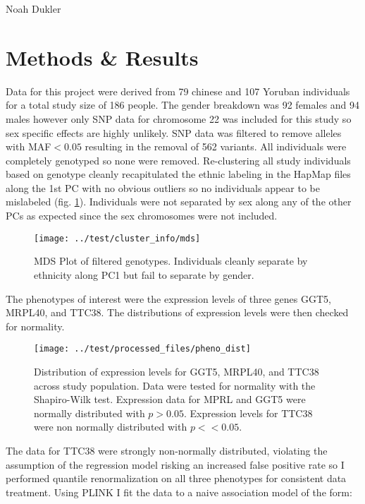 \documentclass[12pt,a4paper]{article}
\begin{document}
\noindent Noah Dukler

\section{Methods \& Results}
Data for this project were derived from 79 chinese and 107 Yoruban individuals for a total study size of 186 people. The gender breakdown was 92 females and 94 males however only SNP data for chromosome 22 was included for this study so sex specific effects are highly unlikely. SNP data was filtered to remove alleles with MAF$<0.05$ resulting in the removal of 562 variants. All individuals were completely genotyped so none were removed. Re-clustering all study individuals based on genotype cleanly recapitulated the ethnic labeling in the HapMap files along the 1st PC with no obvious outliers so no individuals appear to be mislabeled (fig. \ref{fig:mds}). Individuals were not separated by sex along any of the other PCs as expected since the sex chromosomes were not included.   

\begin{figure}[h]
\centering
\texttt{[image: ../test/cluster\_info/mds]}
\caption[MDS Plot]{MDS Plot of filtered genotypes. Individuals cleanly separate by ethnicity along PC1 but fail to separate by gender.}
\label{fig:mds}
\end{figure}

The phenotypes of interest were the expression levels of three genes GGT5, MRPL40, and TTC38. The distributions of expression levels were then checked for normality. 

\begin{figure}[h]
\centering
\texttt{[image: ../test/processed\_files/pheno\_dist]}
\caption[Pheno_dist]{Distribution of expression levels for GGT5, MRPL40, and TTC38 across study population. Data were tested for normality with the Shapiro-Wilk test. Expression data for MPRL and GGT5 were normally distributed with $p>0.05$. Expression levels for TTC38 were non normally distributed with $p<<0.05$.}
\label{fig:pheno_dist}
\end{figure}

The data for TTC38 were strongly non-normally distributed, violating the assumption of the regression model risking an increased false positive rate so I performed quantile renormalization on all three phenotypes for consistent data treatment. Using PLINK I fit the data to a naive association model of the form:
\end{document}
